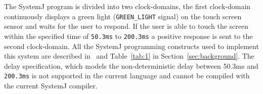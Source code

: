 The SystemJ program is divided into two clock-domains, the first
clock-domain continuously displays a green light (\texttt{GREEN\_LIGHT}
signal) on the touch screen sensor and waits for the user to respond. If
the user is able to touch the screen within the specified time of
\texttt{50.3ms} to \texttt{200.3ms} a positive response is sent to the
second clock-domain. All the SystemJ programming constructs used to
implement this system are described in~\cite{amal10} and
Table~\ref{tab:1} in Section~\ref{sec:background}. The delay
speciﬁcation, which models the non-deterministic delay between 50.3ms
and \texttt{200.3ms} is not supported in the current language and cannot
be compiled with the current SystemJ compiler.


